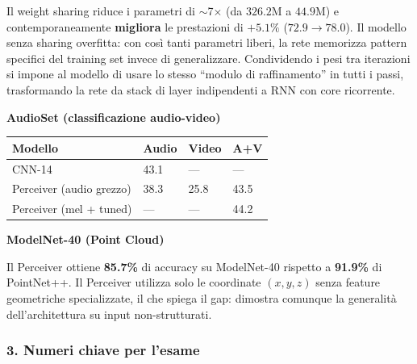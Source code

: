\documentclass[
  11pt,
]{article}
\begin{document}
\begin{notabox}[title={\textbf{Weight sharing come regolarizzatore}}]
Il weight sharing riduce i parametri di $\sim$7$\times$ (da $326.2$M a $44.9$M) e contemporaneamente \textbf{migliora} le prestazioni di $+5.1\%$ ($72.9 \to 78.0$). Il modello senza sharing overfitta: con così tanti parametri liberi, la rete memorizza pattern specifici del training set invece di generalizzare. Condividendo i pesi tra iterazioni si impone al modello di usare lo stesso ``modulo di raffinamento'' in tutti i passi, trasformando la rete da stack di layer indipendenti a RNN con core ricorrente.
\end{notabox}

\textbf{AudioSet (classificazione audio-video)}

{\small
\begin{longtable}{@{}p{4.5cm} p{2.2cm} p{2.2cm} p{2.2cm}@{}}
\toprule
\textbf{Modello} & \textbf{Audio} & \textbf{Video} & \textbf{A+V} \\
\midrule
\endhead
CNN-14 & 43.1 & --- & --- \\[2pt]
Perceiver (audio grezzo) & 38.3 & 25.8 & 43.5 \\[2pt]
Perceiver (mel + tuned) & --- & --- & 44.2 \\
\bottomrule
\end{longtable}
}

\textbf{ModelNet-40 (Point Cloud)}

Il Perceiver ottiene \textbf{85.7\%} di accuracy su ModelNet-40 rispetto a \textbf{91.9\%} di PointNet++. Il Perceiver utilizza solo le coordinate $(x,y,z)$ senza feature geometriche specializzate, il che spiega il gap: dimostra comunque la generalità dell'architettura su input non-strutturati.

\subsubsection*{3. Numeri chiave per l'esame}
\end{document}
